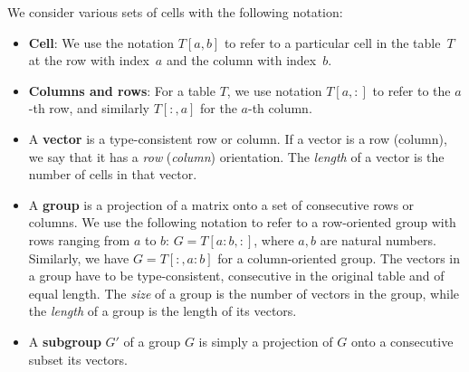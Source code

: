 \documentclass{sig-alternate-05-2015}
\newcommand{\groups}{\ensuremath{\mathcal{G}}\xspace}
\begin{document}
We consider various sets of cells with the following notation:
\begin{itemize}
  \item {\bf Cell}: We use the notation $T[a,b]$ to refer to a particular cell in the table~$T$ at the row with index~$a$ and the column with index~$b$.

  \item {\bf Columns and rows}: For a table $T$, we use notation $T[a,{:}]$ to refer to the $a$-th row, and similarly $T[{:},a]$ for the $a$-th column. %

  \item
  A \textbf{vector} is a type-consistent row or column.
  If a vector is a row (column), we say that it has a \textit{row} (\textit{column}) orientation. The \textit{length} of a vector is the number of cells in that vector.

  \item
  A \textbf{group} is a projection of a matrix onto a set of consecutive rows or columns. %
  We use the following notation to refer to a row-oriented group with rows ranging from $a$ to $b$: $G = T[a{:}b,:]$, where $a,b$ are natural numbers. Similarly, we have $G = T[{:},a{:}b]$ for a column-oriented group.
  The vectors in a group have to be type-consistent, consecutive in the original table and of equal length.
  The \textit{size} of a group is the number of vectors in the group, while the \textit{length} of a group is the length of its vectors. 

  \item
  A \textbf{subgroup} $G'$ of a group $G$ is simply a projection of $G$ onto a consecutive subset its vectors. %
\end{itemize}
\end{document}
